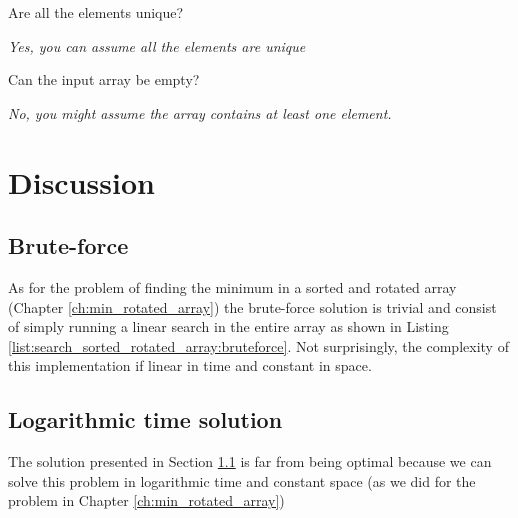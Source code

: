 \begin{QandA}
	\item Are all the elements unique? 
	\begin{answered}
		\textit{Yes, you can assume all the elements are unique}
	\end{answered}
	\item Can the input array be empty?
	\begin{answered}
		\textit{No, you might assume the array contains at least one element.}
	\end{answered}
\end{QandA}


\section{Discussion}
\label{search_sorted_rotated_array:sec:discussion}


\subsection{Brute-force}
\label{search_sorted_rotated_array:sec:bruteforce}
As for the problem of finding the minimum in a sorted and rotated array (Chapter \ref{ch:min_rotated_array}) the brute-force solution is trivial and consist of simply running a linear search in the entire array as shown in Listing \ref{list:search_sorted_rotated_array:bruteforce}.
Not surprisingly, the complexity of this implementation if linear in time and constant in space.



\subsection{Logarithmic time solution}
\label{search_sorted_rotated_array:sec:log}
The solution presented in Section \ref{search_sorted_rotated_array:sec:bruteforce} is far from being optimal because we can solve this problem in logarithmic time and constant space (as we did for the problem in Chapter \ref{ch:min_rotated_array})



